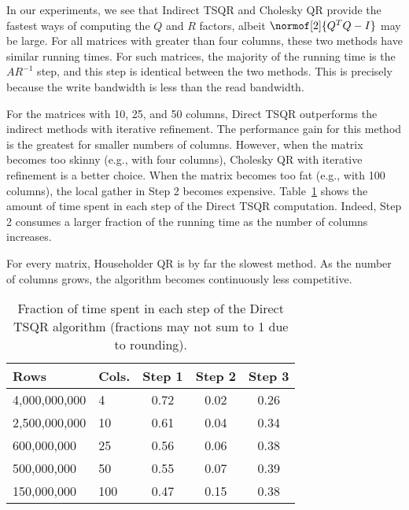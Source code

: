 \documentclass[10pt, conference, compsocconf]{IEEEtran}
\begin{document}
In our experiments, we see that Indirect TSQR and Cholesky QR provide the fastest ways of computing the $Q$ and $R$ factors, albeit $\normof[2]{Q^TQ - I}$ may be large.  For all matrices with greater than four columns, these two methods have similar running times.  For such matrices, the majority of the running time is the $AR^{-1}$ step, and this step is identical between the two methods.  This is precisely because the write bandwidth is less than the read bandwidth.

For the matrices with 10, 25, and 50 columns, Direct TSQR outperforms the indirect methods with iterative refinement.  The performance gain for this method is the greatest for smaller numbers of columns.  However, when the matrix becomes too skinny (e.g., with four columns), Cholesky QR with iterative refinement is a better choice.  When the matrix becomes too fat (e.g., with 100 columns), the local gather in Step 2 becomes expensive.  Table~\ref{tab:perf_parts} shows the amount of time spent in each step of the Direct TSQR computation.  Indeed, Step 2 consumes a larger fraction of the running time as the number of columns increases.

For every matrix, Householder QR is by far the slowest method.  As the number of columns grows, the algorithm becomes continuously less competitive.

\begin{table}[tbp]
\vspace{-\baselineskip}
\caption{Fraction of time spent in each step of the Direct TSQR algorithm (fractions may not sum to 1 due to rounding).}
\centering
\begin{tabular}{l l @{\qquad\qquad} c c c}
\toprule
Rows & Cols. & Step 1 & Step 2 & Step 3 \\
\midrule
4,000,000,000 & 4     &  0.72 & 0.02 & 0.26 \\
2,500,000,000 & 10   & 0.61 & 0.04  & 0.34 \\
600,000,000    & 25   & 0.56 & 0.06 & 0.38 \\
500,000,000    & 50   & 0.55 & 0.07 & 0.39 \\
150,000,000    & 100 & 0.47 & 0.15 & 0.38 \\
\bottomrule
\end{tabular}
\label{tab:perf_parts}
\end{table}
\end{document}
